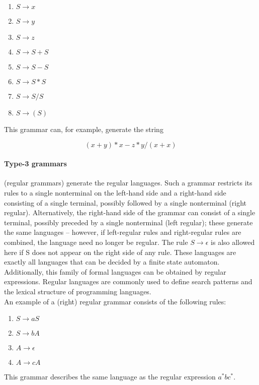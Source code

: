\documentclass[12pt,b5paper]{book}
\theoremstyle{definition}
\begin{document}
\begin{enumerate}
\item $S \rightarrow x$
\item $S \rightarrow y$
\item $S \rightarrow z$
\item $S \rightarrow S + S$
\item $S \rightarrow S - S$
\item $S \rightarrow S * S$
\item $S \rightarrow S / S$
\item $S \rightarrow ( S )$
\end{enumerate}

This grammar can, for example, generate the string

$$( x + y ) * x - z * y / ( x + x )$$

\paragraph{Type-3 grammars} (regular grammars) generate the regular languages. Such a grammar restricts its rules to a single nonterminal on the left-hand side and a right-hand side consisting of a single terminal, possibly followed by a single nonterminal (right regular). Alternatively, the right-hand side of the grammar can consist of a single terminal, possibly preceded by a single nonterminal (left regular); these generate the same languages – however, if left-regular rules and right-regular rules are combined, the language need no longer be regular. The rule $S \rightarrow \epsilon$ is also allowed here if S does not appear on the right side of any rule. These languages are exactly all languages that can be decided by a finite state automaton. Additionally, this family of formal languages can be obtained by regular expressions. Regular languages are commonly used to define search patterns and the lexical structure of programming languages. \\

An example of a (right) regular grammar consists of the following rules:

\begin{enumerate}
\item $S \rightarrow aS$
\item $S \rightarrow bA$
\item $A \rightarrow \epsilon$
\item $A \rightarrow cA$
\end{enumerate}

This grammar describes the same language as the regular expression $a^{*}bc^{*}$.
\end{document}
